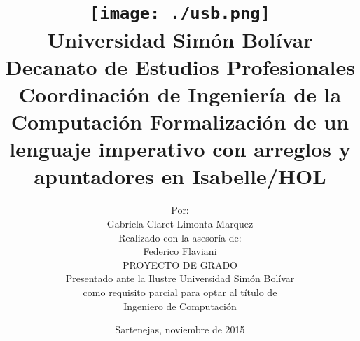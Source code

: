 \begin{titlepage}
\begin{center}
    \title{\vspace{-2cm} \texttt{[image: ./usb.png]} \\[.2cm]
        \large Universidad Simón Bolívar \\
        Decanato de Estudios Profesionales \\
        Coordinación de Ingeniería de la Computación
        \vfill \LARGE Formalización de un lenguaje imperativo con arreglos y apuntadores en Isabelle/HOL \vfill}
    \author{Por: \\
        Gabriela Claret Limonta Marquez\\
        Realizado con la asesoría de: \\
        Federico Flaviani \\[1.2cm]
        PROYECTO DE GRADO \\
Presentado ante la Ilustre Universidad Simón Bolívar \\
como requisito parcial para optar al título de \\
Ingeniero de Computación\linebreak\linebreak}
    \date{Sartenejas, noviembre de 2015}
\end{center}
\end{titlepage}
